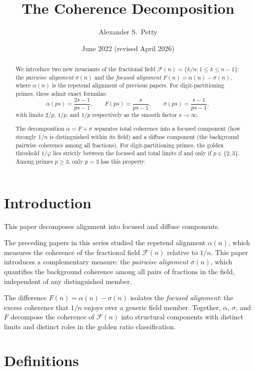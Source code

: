 \documentclass[12pt]{amsart}
\title{The Coherence Decomposition}
\author{Alexander S.\ Petty}
\date{June 2022 (revised April 2026)}
\theoremstyle{definition}
\theoremstyle{remark}
\begin{document}
\begin{abstract}
We introduce two new invariants of the fractional field
$\mathcal{F}(n) = \{k/n : 1 \le k \le n{-}1\}$: the \emph{pairwise
alignment} $\sigma(n)$ and the \emph{focused alignment}
$F(n) = \alpha(n) - \sigma(n)$, where $\alpha(n)$ is the repetend
alignment of previous papers. For digit-partitioning primes, these
admit exact formulas:
\[
\alpha(ps) = \frac{2s-1}{ps-1}, \qquad
F(ps) = \frac{s}{ps-1}, \qquad
\sigma(ps) = \frac{s-1}{ps-1},
\]
with limits $2/p$, $1/p$, and $1/p$ respectively as the smooth
factor $s \to \infty$.

The decomposition $\alpha = F + \sigma$ separates total coherence into
a focused component (how strongly $1/n$ is distinguished within its
field) and a diffuse component (the background pairwise coherence
among all fractions). For digit-partitioning primes, the golden threshold
$1/\varphi$ lies strictly between the focused and total
limits if and only if $p \in \{2, 3\}$. Among primes
$p \ge 3$, only $p = 3$ has this property.
\end{abstract}
\maketitle

\section{Introduction}

This paper decomposes alignment into focused and diffuse components.

The preceding papers in this series studied the repetend alignment
$\alpha(n)$, which measures the coherence of the fractional field
$\mathcal{F}(n)$ relative to $1/n$. This paper introduces a
complementary measure: the \emph{pairwise alignment} $\sigma(n)$,
which quantifies the background coherence among all pairs of
fractions in the field, independent of any distinguished member.

The difference $F(n) = \alpha(n) - \sigma(n)$ isolates the
\emph{focused alignment}: the excess coherence that $1/n$ enjoys
over a generic field member. Together, $\alpha$, $\sigma$, and $F$
decompose the coherence of $\mathcal{F}(n)$ into structural
components with distinct limits and distinct roles in the golden
ratio classification.

\section{Definitions}
\end{document}
